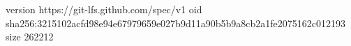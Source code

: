 version https://git-lfs.github.com/spec/v1
oid sha256:3215102acfd98e94e67979659e027b9d11a90b5b9a8cb2a1fe2075162c012193
size 262212
